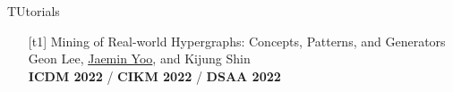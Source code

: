 \documentclass{resume} %
\begin{document}

\begin{rSection}{TUtorials}
\smallskip
\begin{enumerate}[leftmargin=*]

	\item[{[t1]}]
		Mining of Real-world Hypergraphs: Concepts, Patterns, and Generators \\
		Geon Lee, \underline{Jaemin Yoo}, and Kijung Shin \\
		\textbf{ICDM 2022} / \textbf{CIKM 2022} / \textbf{DSAA 2022} \\

\end{enumerate}
\end{rSection}

\end{document}
